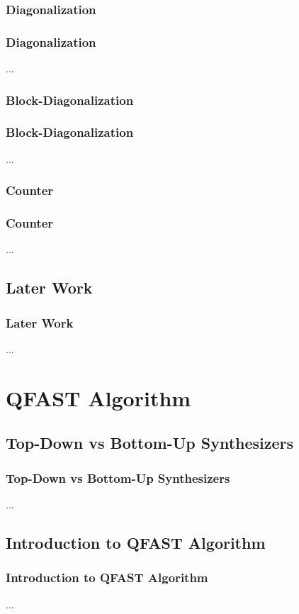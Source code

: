 \documentclass[aspectratio=1610]{beamer}
\begin{document}
\subsubsection{Diagonalization}
\begin{frame}
\frametitle{Diagonalization}
...
\end{frame}

\subsubsection{Block-Diagonalization}
\begin{frame}
\frametitle{Block-Diagonalization}
...
\end{frame}

\subsubsection{Counter}
\begin{frame}
\frametitle{Counter}
...
\end{frame}

\subsection{Later Work}
\begin{frame}
\frametitle{Later Work}
...
\end{frame}

\section{QFAST Algorithm}

\subsection{Top-Down vs Bottom-Up Synthesizers}
\begin{frame}
\frametitle{Top-Down vs Bottom-Up Synthesizers}
...
\end{frame}

\subsection{Introduction to QFAST Algorithm}
\begin{frame}
\frametitle{Introduction to QFAST Algorithm}
...
\end{frame}
\end{document}
